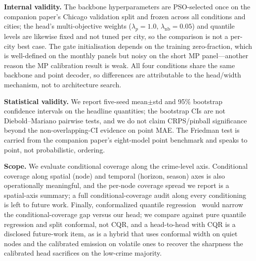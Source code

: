 \documentclass[11pt,conference]{IEEEtran}
\begin{document}
\textbf{Internal validity.} The backbone hyperparameters are PSO-selected once
on the companion paper's Chicago validation split and frozen across all
conditions and cities; the head's multi-objective weights ($\lambda_p{=}1.0$,
$\lambda_{\mathrm{nb}}{=}0.05$) and quantile levels are likewise fixed and not
tuned per city, so the comparison is not a per-city best case. The gate
initialisation depends on the training zero-fraction, which is well-defined on
the monthly panels but noisy on the short MP panel---another reason the MP
calibration result is weak. All four conditions share the same backbone and
point decoder, so differences are attributable to the head/width mechanism, not
to architecture search.

\textbf{Statistical validity.} We report five-seed mean$\pm$std and 95\%
bootstrap confidence intervals on the headline quantities; the bootstrap CIs are
not Diebold--Mariano pairwise tests, and we do not claim CRPS/pinball
significance beyond the non-overlapping-CI evidence on point MAE. The Friedman
test is carried from the companion paper's eight-model point benchmark and
speaks to point, not probabilistic, ordering.

\textbf{Scope.} We evaluate conditional coverage along the crime-level axis.
Conditional coverage along spatial (node) and temporal (horizon, season) axes is
also operationally meaningful, and the per-node coverage spread we report is a
spatial-axis summary; a full conditional-coverage audit along every conditioning
is left to future work. Finally, conformalized quantile
regression~\cite{romano2019cqr} would narrow the conditional-coverage gap
versus our head; we compare against pure quantile regression and split conformal,
not CQR, and a head-to-head with CQR is a disclosed future-work item, as is a
hybrid that uses conformal width on quiet nodes and the calibrated emission on
volatile ones to recover the sharpness the calibrated head sacrifices on the
low-crime majority.

\end{document}
